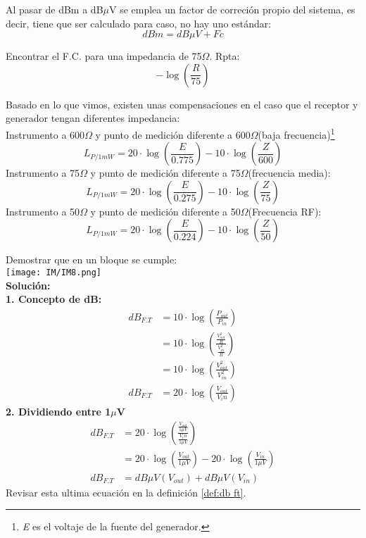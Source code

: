 \documentclass[
	12pt, %
	fleqn, %
	a4paper, %
]{LegrandOrangeBook}
\begin{document}
\begin{definition}
Al pasar de dBm a dB$\mu$V se emplea un factor de correción propio del sistema, es decir, tiene que ser calculado para caso, no hay uno estándar:
\begin{equation}
dBm=dB\mu V + Fc
\end{equation}
\end{definition}
\begin{exercise}
Encontrar el F.C. para una impedancia de 75$\Omega$. Rpta:
\begin{displaymath}
-\log\left(\frac{R}{75}\right)
\end{displaymath}
\end{exercise}
\begin{definition}
Basado en lo que vimos, existen unas compensaciones en el caso que el receptor y generador tengan diferentes impedancia:\\Instrumento a 600$\Omega$ y punto de medición diferente a 600$\Omega$(baja frecuencia)\footnote{\textit{E} es el voltaje de la fuente del generador.}
\begin{equation}
L_{P/1mW}=20\cdot\log\left(\frac{E}{0.775}\right)-10\cdot\log\left(\frac{Z}{600}\right)
\end{equation}
Instrumento a 75$\Omega$ y punto de medición diferente a 75$\Omega$(frecuencia media):
\begin{equation}
L_{P/1mW}=20\cdot\log\left(\frac{E}{0.275}\right)-10\cdot\log\left(\frac{Z}{75}\right)
\end{equation}
Instrumento a 50$\Omega$ y punto de medición diferente a 50$\Omega$(Frecuencia RF):
\begin{equation}
L_{P/1mW}=20\cdot\log\left(\frac{E}{0.224}\right)-10\cdot\log\left(\frac{Z}{50}\right)
\end{equation}
\end{definition}
\begin{example}[Demostraciones]
Demostrar que en un bloque se cumple:\\
\texttt{[image: IM/IM8.png]}\\
\textbf{Solución:}\\
\textbf{1. Concepto de dB:}
\begin{align}
dB_{F.T}&=10\cdot\log\left(\frac{P_{out}}{P_{in}}\right)\\
&=10\cdot\log\left(\frac{\frac{V_{out}^2}{R}}{\frac{V_{in}^2}{R}}\right)\\
&=10\cdot\log\left(\frac{V_{out}^2}{V_{in}^2}\right)\\
dB_{F.T}&=20\cdot\log\left(\frac{V_{out}}{V_in}\right)
\end{align}
\textbf{2. Dividiendo entre 1$\mu$V}
\begin{align}
dB_{F.T}&=20\cdot\log\left(\frac{\frac{V_{out}}{1\mu V}}{\frac{V_in}{1\mu V}}\right)\\
&=20\cdot\log\left(\frac{V_{out}}{1\mu V}\right)-20\cdot\log\left(\frac{V_{in}}{1\mu V}\right)\\
dB_{F.T}&=dB\mu V(V_{out})+dB\mu V(V_{in})
\end{align}
Revisar esta ultima ecuación en la definición \ref{def:db ft}.
\end{example}
\end{document}
